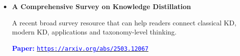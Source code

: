 \documentclass[10pt]{article}
\begin{document}
\begin{itemize}
\item \textbf{A Comprehensive Survey on Knowledge Distillation}\par
A recent broad survey resource that can help readers connect classical KD, modern KD, applications and taxonomy-level thinking.\par
\textcolor{blue}{\textbf{Paper:}} \href{https://arxiv.org/abs/2503.12067}{\textcolor{blue}{\nolinkurl{https://arxiv.org/abs/2503.12067}}}

\end{itemize}
\end{document}
